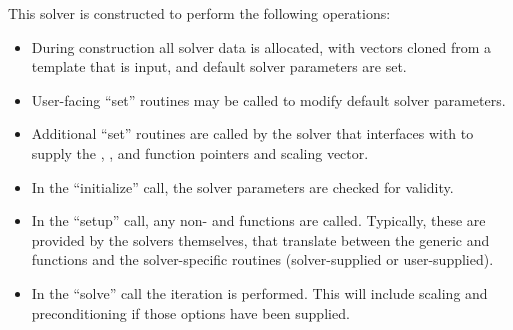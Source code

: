 This solver is constructed to perform the following operations:
\begin{itemize}
\item During construction all {\nvector} solver data is allocated,
  with vectors cloned from a template {\nvector} that is input, and
  default solver parameters are set.
\item User-facing ``set'' routines may be called to modify default
  solver parameters.
\item Additional ``set'' routines are called by the {\sundials} solver
  that interfaces with {\sunlinsolpcg} to supply the ,
  ,  and  function pointers and
   scaling vector.
\item In the ``initialize'' call, the solver parameters are checked
  for validity.
\item In the ``setup'' call, any non-  and
   functions are called.  Typically, these are provided by
  the {\sundials} solvers themselves, that translate between the
  generic  and  functions and the
  solver-specific routines (solver-supplied or user-supplied).
\item In the ``solve'' call the {\pcg} iteration is performed.  This
  will include scaling and preconditioning if those options have been
  supplied.
\end{itemize}

